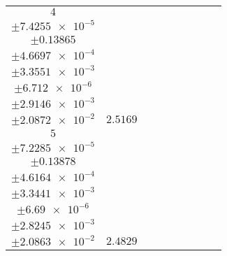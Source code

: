 \documentclass[8pt]{article}
\begin{document}
\begin{longtable}[l]{c c c c c c c c c}
$\num{4}$ & \begin{tabular}[c]{@{}c@{}}$\num{3.1018e-2}$ \\ $\pm\num{7.4255e-5}$\end{tabular} & \begin{tabular}[c]{@{}c@{}}$\num{-0.27133}$ \\ $\pm\num{0.13865}$\end{tabular} & \begin{tabular}[c]{@{}c@{}}$\num{-5.6985}$ \\ $\pm\num{4.6697e-4}$\end{tabular} & \begin{tabular}[c]{@{}c@{}}$\num{1.8519e+3}$ \\ $\pm\num{3.3551e-3}$\end{tabular} & \begin{tabular}[c]{@{}c@{}}$\num{3.7048}$ \\ $\pm\num{6.712e-6}$\end{tabular} & \begin{tabular}[c]{@{}c@{}}$\num{1.1818}$ \\ $\pm\num{2.9146e-3}$\end{tabular} & \begin{tabular}[c]{@{}c@{}}$\num{4.2289}$ \\ $\pm\num{2.0872e-2}$\end{tabular} & $\num{2.5169}$\\
$\num{5}$ & \begin{tabular}[c]{@{}c@{}}$\num{3.0471e-2}$ \\ $\pm\num{7.2285e-5}$\end{tabular} & \begin{tabular}[c]{@{}c@{}}$\num{0.18106}$ \\ $\pm\num{0.13878}$\end{tabular} & \begin{tabular}[c]{@{}c@{}}$\num{5.6989}$ \\ $\pm\num{4.6164e-4}$\end{tabular} & \begin{tabular}[c]{@{}c@{}}$\num{1.8633e+3}$ \\ $\pm\num{3.3441e-3}$\end{tabular} & \begin{tabular}[c]{@{}c@{}}$\num{3.7276}$ \\ $\pm\num{6.69e-6}$\end{tabular} & \begin{tabular}[c]{@{}c@{}}$\num{1.1549}$ \\ $\pm\num{2.8245e-3}$\end{tabular} & \begin{tabular}[c]{@{}c@{}}$\num{4.1804}$ \\ $\pm\num{2.0863e-2}$\end{tabular} & $\num{2.4829}$\\

\end{longtable}
\end{document}
